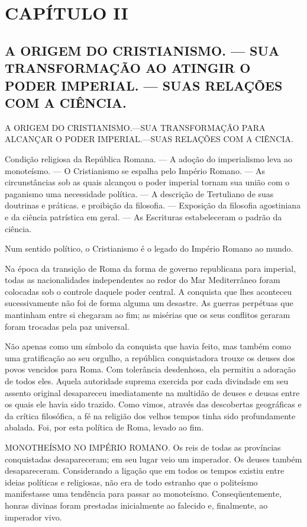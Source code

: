 \documentclass[11pt,a5paper,twoside,openany]{book}
\begin{document}
\clearpage
\chapter*{CAPÍTULO II}
\section*{A ORIGEM DO CRISTIANISMO. — SUA TRANSFORMAÇÃO AO ATINGIR O PODER IMPERIAL. — SUAS RELAÇÕES COM A CIÊNCIA.}
A ORIGEM DO CRISTIANISMO.—SUA TRANSFORMAÇÃO PARA ALCANÇAR O PODER IMPERIAL.—SUAS RELAÇÕES COM A CIÊNCIA.

Condição religiosa da República Romana. — A adoção do imperialismo leva ao monoteísmo. — O Cristianismo se espalha pelo Império Romano. — As circunstâncias sob as quais alcançou o poder imperial tornam sua união com o paganismo uma necessidade política. — A descrição de Tertuliano de suas doutrinas e práticas. e proibição da filosofia. — Exposição da filosofia agostiniana e da ciência patrística em geral. — As Escrituras estabeleceram o padrão da ciência.

Num sentido político, o Cristianismo é o legado do Império Romano ao mundo.

Na época da transição de Roma da forma de governo republicana para imperial, todas as nacionalidades independentes ao redor do Mar Mediterrâneo foram colocadas sob o controle daquele poder central. A conquista que lhes aconteceu sucessivamente não foi de forma alguma um desastre. As guerras perpétuas que mantinham entre si chegaram ao fim; as misérias que os seus conflitos geraram foram trocadas pela paz universal.

Não apenas como um símbolo da conquista que havia feito, mas também como uma gratificação ao seu orgulho, a república conquistadora trouxe os deuses dos povos vencidos para Roma. Com tolerância desdenhosa, ela permitiu a adoração de todos eles. Aquela autoridade suprema exercida por cada divindade em seu assento original desapareceu imediatamente na multidão de deuses e deusas entre os quais ele havia sido trazido. Como vimos, através das descobertas geográficas e da crítica filosófica, a fé na religião dos velhos tempos tinha sido profundamente abalada. Foi, por esta política de Roma, levado ao fim.

MONOTHEÍSMO NO IMPÉRIO ROMANO. Os reis de todas as províncias conquistadas desapareceram; em seu lugar veio um imperador. Os deuses também desapareceram. Considerando a ligação que em todos os tempos existiu entre ideias políticas e religiosas, não era de todo estranho que o politeísmo manifestasse uma tendência para passar ao monoteísmo. Conseqüentemente, honras divinas foram prestadas inicialmente ao falecido e, finalmente, ao imperador vivo.
\end{document}

